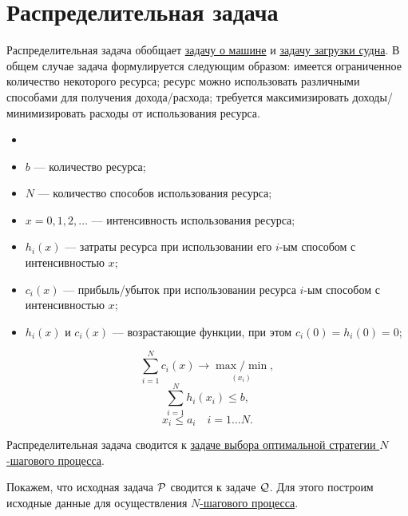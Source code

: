 \section{Распределительная задача}

\problem[распределительная]\label{pr:distribution}

Распределительная задача обобщает \hyperref[pr:car_on_island]{задачу о машине} и \hyperref[pr:loading_vessel]{задачу загрузки судна}. В общем случае задача формулируется следующим образом: имеется ограниченное количество некоторого ресурса; ресурс можно использовать различными способами для получения дохода/расхода; требуется максимизировать доходы/минимизировать расходы от использования ресурса.

\mathmodel

\begin{itemize}[nosep]
	\item[]

	\item $b$ --- количество ресурса;
	
	\item $N$ --- количество способов использования ресурса;
	
	\item $x = 0, 1, 2, \dots$ --- интенсивность использования ресурса;
	
	\item $h_i(x)$ --- затраты ресурса при использовании его $i$-ым способом с интенсивностью $x$;
	
	\item $c_i(x)$ --- прибыль/убыток при использовании ресурса $i$-ым способом с интенсивностью $x$;
	
	\item $h_i(x)$ и $c_i(x)$ --- возрастающие функции, при этом $c_i(0) = h_i(0) = 0$;
\end{itemize}

\[
\sum_{i=1}^{N}c_i(x) \to \underset{(x_i)}{\max / \min},
\]
\[
\sum_{i=1}^{N} h_i(x_i) \le b,
\]
\[
x_i \le a_i \quad i = 1 \dots N.
\]

\fact

Распределительная задача сводится к \hyperref[alg:opt_strategy]{задаче выбора оптимальной стратегии $N$-шагового процесса}.

\prooof

Покажем, что исходная задача $\P$ сводится к задаче $\Q$. Для этого построим исходные данные для осуществления \hyperref[alg:n_step_process]{$N$-шагового процесса}.

